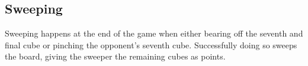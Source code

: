 \subsection{Sweeping}
Sweeping happens at the end of the game when either bearing off the seventh and final cube or pinching the opponent's seventh cube.
Successfully doing so sweeps the board, giving the sweeper the remaining cubes as points.
